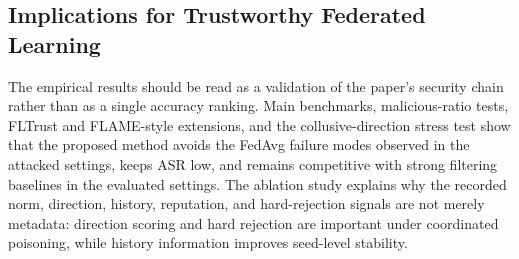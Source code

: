 \documentclass[preprint,12pt]{elsarticle}
\begin{document}
\begin{table}[t]
\centering
\caption{Event-driven validator-finality simulation. The network column reports bandwidth/RTT; rates are percentages over 500 trials. Higher valid finalization and invalid rejection are better; lower invalid acceptance and timeout are better.}
\label{tab:network-events}
\end{table}

\subsection{Implications for Trustworthy Federated Learning}

The empirical results should be read as a validation of the paper's security chain rather than as a single accuracy ranking. Main benchmarks, malicious-ratio tests, FLTrust and FLAME-style extensions, and the collusive-direction stress test show that the proposed method avoids the FedAvg failure modes observed in the attacked settings, keeps ASR low, and remains competitive with strong filtering baselines in the evaluated settings. The ablation study explains why the recorded norm, direction, history, reputation, and hard-rejection signals are not merely metadata: direction scoring and hard rejection are important under coordinated poisoning, while history information improves seed-level stability.
\end{document}
